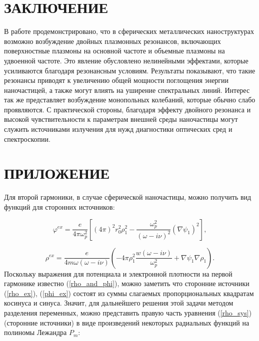 \documentclass[12pt, a4paper]{article}
\def \w {\omega}
\def \ph {\varphi}
\begin{document}
\section{ЗАКЛЮЧЕНИЕ}

В работе продемонстрировано, что в сферических металлических наноструктурах возможно возбуждение двойных плазмонных резонансов, включающих поверхностные плазмоны на основной частоте и объемные плазмоны на удвоенной частоте. Это явление обусловлено нелинейными эффектами, которые усиливаются благодаря резонансным условиям. Результаты показывают, что такие резонансы приводят к увеличению общей мощности поглощения энергии наночастицей, а также могут влиять на уширение спектральных линий. Интерес так же представляет возбуждение монопольных колебаний, которые обычно слабо проявляются. С практической стороны, благодаря эффекту двойного резонанса и высокой чувствительности к параметрам внешней среды наночастицы могут служить источниками излучения для нужд диагностики оптических сред и спектроскопии.
\newpage
\appendix
\section*{\hfill ПРИЛОЖЕНИЕ}


Для второй гармоники, в случае сферической наночастицы, можно получить вид функций для сторонних источников:

\begin{equation} 	
 \ph^{ex} = \frac{e}{4 \pi \w_p^2}[(4\pi)^2r_0^2\rho_1^2 - \frac{\w_p^2}{(\w - i \nu)^2}(\nabla \psi_1)^2], 
\end{equation}

\begin{equation} 	
\rho^{ex} = \frac{e}{4 m \w(\w - i \nu)}(-4 \pi \rho_1^2 \frac{w(\w - i \nu)}{\w_p^2} + \nabla \psi_1\nabla \rho_1).
\end{equation}
Поскольку выражения для потенциала и электронной плотности на первой гармонике известно (\ref{rho_and_phi}), можно заметить что сторонние источники (\ref{rho_ex}), (\ref{phi_ex}) состоят из суммы слагаемых пропорциональных квадратам косинуса и синуса. Значит, для дальнейшего решения этой задачи методом разделения переменных, можно представить правую часть уравнения (\ref{rho_sys}) (сторонние источники) в виде произведений некоторых радиальных функций на
полиномы Лежандра $P_m$:
\end{document}
